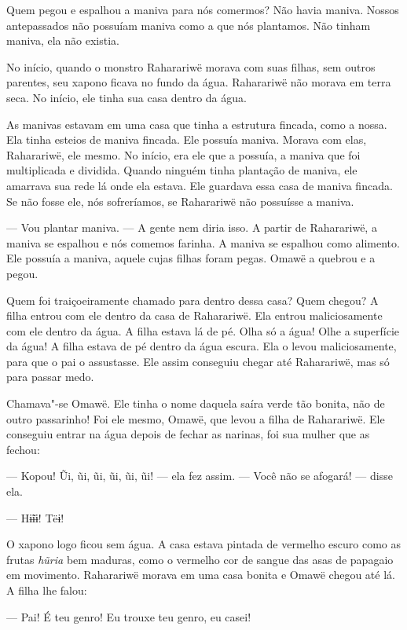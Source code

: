  

{Q}{uem pegou} e espalhou a maniva para nós comermos? Não havia maniva.
Nossos antepassados não possuíam maniva como a que nós plantamos. Não
tinham maniva, ela não existia. 

No início, quando o monstro Raharariwë morava com suas filhas, sem outros
parentes, seu xapono ficava no fundo da água. Raharariwë não morava em
terra seca. No início, ele tinha sua casa dentro da água. 

As manivas estavam em uma casa que tinha a estrutura fincada, como a
nossa. Ela tinha esteios de maniva fincada. Ele possuía maniva. Morava
com elas, Raharariwë, ele mesmo. No início, era ele que a possuía, a
maniva que foi multiplicada e dividida. Quando ninguém tinha plantação
de maniva, ele amarrava sua rede lá onde ela estava. Ele guardava essa casa
de maniva fincada. Se não fosse ele, nós sofreríamos, se Raharariwë não
possuísse a maniva. 

--- Vou plantar maniva. --- A gente nem diria isso. A partir de
Raharariwë, a maniva se espalhou e nós comemos farinha. A maniva se
espalhou como alimento. Ele possuía a maniva, aquele cujas filhas foram
pegas. Omawë a quebrou e a pegou.

Quem foi traiçoeiramente chamado para dentro dessa casa? Quem chegou? A
filha entrou com ele dentro da casa de Raharariwë. Ela
entrou maliciosamente com ele dentro da água. A filha estava lá de pé.
Olha só a água! Olhe a superfície da água! A filha estava de pé dentro
da água escura. Ela o levou maliciosamente, para que o pai o assustasse.
Ele assim conseguiu chegar até Raharariwë, mas só para passar medo. 

Chamava"-se Omawë. Ele tinha o nome daquela saíra verde tão bonita, não
de outro passarinho! Foi ele mesmo, Omawë, que levou a filha de
Raharariwë. Ele conseguiu entrar na água depois de fechar as narinas,
foi sua mulher que as fechou:

--- Kopou! Ũi, ũi, ũi, ũi, ũi, ũi! --- ela fez assim. --- Você não se
afogará! --- disse ela. 

--- Hɨ̃ɨɨ! Tëɨ! 

O xapono logo ficou sem água. A casa estava pintada de vermelho escuro como
as frutas \emph{hũria} bem maduras, como o vermelho cor de sangue das
asas de papagaio em movimento. Raharariwë morava em uma casa bonita e
Omawë chegou até lá. A filha lhe falou:

--- Pai! É teu genro! Eu trouxe teu genro, eu casei! 

